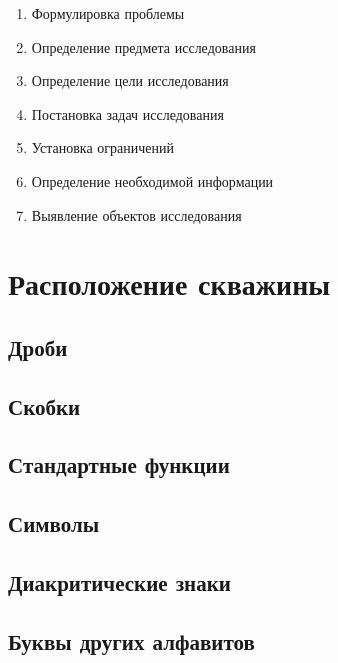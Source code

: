 \documentclass[a4paper,12pt]{article} %
\begin{document}
	\begin{enumerate}
		\item Формулировка проблемы
		\item Определение предмета исследования
		\item Определение цели исследования
		\item Постановка задач исследования
		\item Установка ограничений
		\item Определение необходимой информации
		\item Выявление объектов исследования
	\end{enumerate}
		
	\section{Расположение скважины}
	
	\subsection{Дроби}
	
	\subsection{Скобки}
	
	\subsection{Стандартные функции}
	
	\subsection{Символы}
	
	\subsection{Диакритические знаки}
	
	\subsection{Буквы других алфавитов}
	
\end{document}
